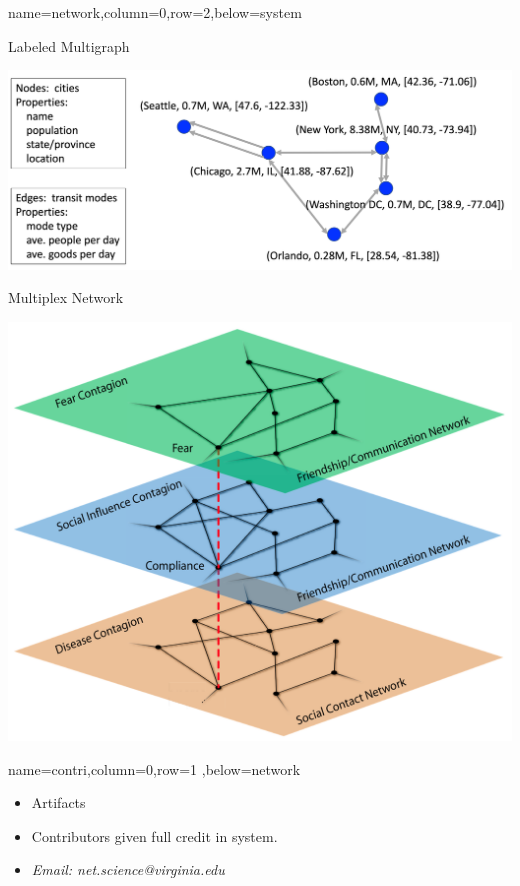 \documentclass[landscape,paperwidth=70in,paperheight=46in,fontscale=0.225]{baposter} %
\begin{document}
\begin{poster}
          {name=network,column=0,row=2,below=system}{         

\begin{minipage}{.5\textwidth}        
Labeled Multigraph
\vspace{3mm}

\centering
\includegraphics[scale=0.25]{figures/single_net.png}
\end{minipage}
\hfill
 \begin{minipage}{.35\textwidth}      
 Multiplex Network
 \vspace{3mm}
 
 \centering
\includegraphics[scale=0.35]{figures/multi_net.png}
\end{minipage}
}
          {name=contri,column=0,row=1 ,below=network}{
\begin{itemize}[leftmargin=*,noitemsep,topsep=0pt]
\item Artifacts
\item Contributors given full credit in system.
\item \textit{Email:  net.science@virginia.edu}
\end{itemize}

}
\end{poster}
\end{document}

